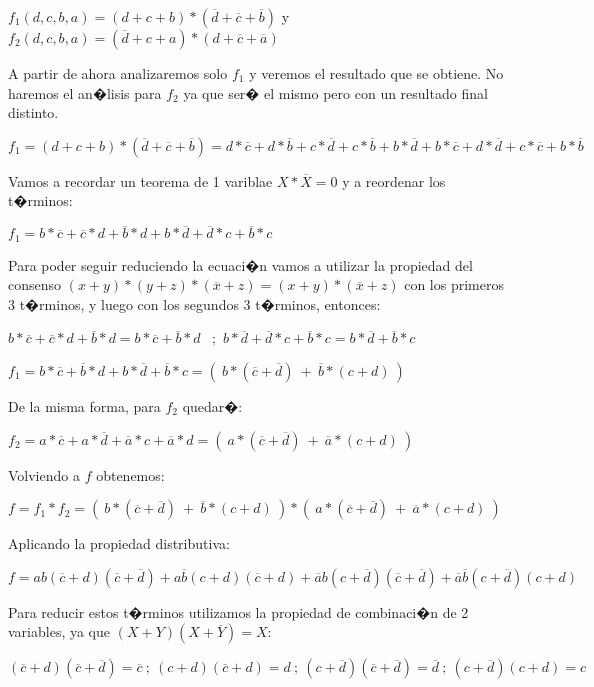$f_{1}(d,c,b,a)=(d+c+b)*(\overline{d}+\overline{c}+\overline{b})$
y $f_{2}(d,c,b,a)=(\overline{d}+c+a)*(d+\overline{c}+\overline{a})$

A partir de ahora analizaremos solo $f_{1}$ y veremos el resultado
que se obtiene. No haremos el an�lisis para $f_{2}$ ya que ser� el
mismo pero con un resultado final distinto. 

$f_{1}=(d+c+b)*(\overline{d}+\overline{c}+\overline{b})=d*\overline{c}+d*\overline{b}+c*\overline{d}+c*\overline{b}+b*\overline{d}+b*\overline{c}+d*\overline{d}+c*\overline{c}+b*\overline{b}$

Vamos a recordar un teorema de 1 variblae $X*\overline{X}=0$ y a
reordenar los t�rminos:

$f_{1}= b*\overline{c} + \overline{c}*d + \overline{b}*d + b*\overline{d} +  \overline{d}*c + \overline{b}*c $

Para poder seguir reduciendo la ecuaci�n vamos a utilizar la propiedad
del consenso $(x+y)*(y+z)*(\overline{x}+z)=(x+y)*(\overline{x}+z)$
con los primeros 3 t�rminos, y luego con los segundos 3 t�rminos,
entonces:

$b*\overline{c}+\overline{c}*d+\overline{b}*d = b*\overline{c}+\overline{b}*d$ \ ;\  $b*\overline{d}+\overline{d}*c+\overline{b}*c = b*\overline{d} + \overline{b}*c$

$f_{1}=b*\overline{c} + \overline{b}*d + b*\overline{d} + \overline{b}*c=(\ b*(\overline{c}+\overline{d})\ +\ \overline{b}*(c+d)\ )$

De la misma forma, para $f_{2}$ quedar�:

$f_{2}=a*\overline{c} + a*\overline{d} + \overline{a}*c + \overline{a}*d =(\ a*(\overline{c}+\overline{d})\ +\ \overline{a}*(c+d)\ ) $

Volviendo a $f$ obtenemos:

$f=f_{1}*f_{2}=(\ b*(\overline{c}+\overline{d})\ +\ \overline{b}*(c+d)\ )*(\ a*(\overline{c}+\overline{d})\ +\ \overline{a}*(c+d)\ )$

Aplicando la propiedad distributiva:

$f=ab(\overline{c}+d)(\overline{c}+\overline{d})+a\overline{b}(c+d)(\overline{c}+d)+\overline{a}b(c+\overline{d})(\overline{c}+\overline{d})+\overline{a}\overline{b}(c+\overline{d})(c+d)$

Para reducir estos t�rminos utilizamos la propiedad de combinaci�n
de 2 variables, ya que $(X+Y)(X+\overline{Y})=X$:

$(\overline{c}+d)(\overline{c}+\overline{d})=\overline{c} \ ;\ (c+d)(\overline{c}+d)=d\ ;\ (c+\overline{d})(\overline{c}+\overline{d})=\overline{d}\ ;\ (c+\overline{d})(c+d)=c$

